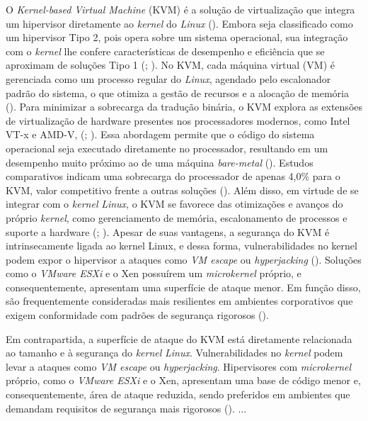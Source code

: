 \begin{itemize}
O \textit{Kernel-based Virtual Machine} (KVM) é a solução de virtualização que integra um hipervisor diretamente ao \textit{kernel} do \textit{Linux} (\cite{carissimi2008}). Embora seja classificado como um hipervisor Tipo 2, pois opera sobre um sistema operacional, sua integração com o \textit{kernel} lhe confere características de desempenho e eficiência que se aproximam de soluções Tipo 1 (\cite{chawla2025}; \cite{kominos2017}). No KVM, cada máquina virtual (VM) é gerenciada como um processo regular do \textit{Linux}, agendado pelo escalonador padrão do sistema, o que otimiza a gestão de recursos e a alocação de memória (\cite{anand2013}).
Para minimizar a sobrecarga da tradução binária, o KVM explora as extensões de virtualização de hardware presentes nos processadores modernos, como Intel VT-x e AMD-V, (\cite{chawla2025}; \cite{carissimi2008}). Essa abordagem permite que o código do sistema operacional seja executado diretamente no processador, resultando em um desempenho muito próximo ao de uma máquina \textit{bare-metal} (\cite{kominos2017}). Estudos comparativos indicam uma sobrecarga do processador de apenas 4,0\% para o KVM, valor competitivo frente a outras soluções (\cite{chawla2025}). Além disso, em virtude de se integrar com o \textit{kernel} \textit{Linux}, o KVM se favorece das otimizações e avanços do próprio \textit{kernel}, como gerenciamento de memória, escalonamento de processos e suporte a hardware (\cite{anand2013}; \cite{arora2014}).
Apesar de suas vantagens, a segurança do KVM é intrinsecamente ligada ao kernel Linux, e dessa forma, vulnerabilidades no kernel podem expor o hipervisor a ataques como \textit{VM escape} ou \textit{hyperjacking} (\cite{chawla2025}). Soluções como o \textit{VMware ESXi} e o Xen possuírem um \textit{microkernel} próprio, e consequentemente, apresentam uma superfície de ataque menor. Em função disso, são frequentemente consideradas mais resilientes em ambientes corporativos que exigem conformidade com padrões de segurança rigorosos (\cite{chawla2025}).



Em contrapartida, a superfície de ataque do KVM está diretamente relacionada ao tamanho e à segurança do \textit{kernel} \textit{Linux}. Vulnerabilidades no \textit{kernel} podem levar a ataques como \textit{VM escape} ou \textit{hyperjacking}. Hipervisores com \textit{microkernel} próprio, como o \textit{VMware ESXi} e o Xen, apresentam uma base de código menor e, consequentemente, área de ataque reduzida, sendo preferidos em ambientes que demandam requisitos de segurança mais rigorosos (\cite{chawla2025}).
{{ ... }}

\end{itemize}
